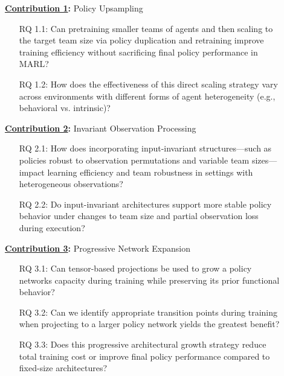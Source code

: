 \begin{description}
    \item[] \textbf{\hyperref[ch:contribution_1]{Contribution 1}:} Policy Upsampling
    \begin{itemize}
        \item[RQ 1.1:] Can pretraining smaller teams of agents and then scaling to the target 
        team size via policy duplication and retraining improve training efficiency 
        without sacrificing final policy performance in MARL?
        \item[RQ 1.2:] How does the effectiveness of this direct scaling strategy vary across 
        environments with different forms of agent heterogeneity 
        (e.g., behavioral vs. intrinsic)?
    \end{itemize}
    \item[]\textbf{\hyperref[ch:contribution_2]{Contribution 2}:} Invariant Observation Processing
    \begin{itemize}
        \item[RQ 2.1:] How does incorporating input-invariant structures—such as policies 
        robust to observation permutations and variable team sizes—impact learning efficiency 
        and team robustness in settings with heterogeneous observations?
        \item[RQ 2.2:] Do input-invariant architectures support more stable policy behavior 
        under changes to team size and partial observation loss during execution?
    \end{itemize}
    \item[] \textbf{\hyperref[ch:contribution_3]{Contribution 3}:} Progressive Network Expansion
    \begin{itemize}
        \item[RQ 3.1:] Can tensor-based projections be used to grow a policy networks 
        capacity during training while preserving its prior functional behavior?
        \item[RQ 3.2:] Can we identify appropriate transition points during training 
        when projecting to a larger policy network yields the greatest benefit?
        \item[RQ 3.3:] Does this progressive architectural growth strategy reduce total training 
        cost or improve final policy performance compared to fixed-size architectures?
    \end{itemize}
\end{description}


